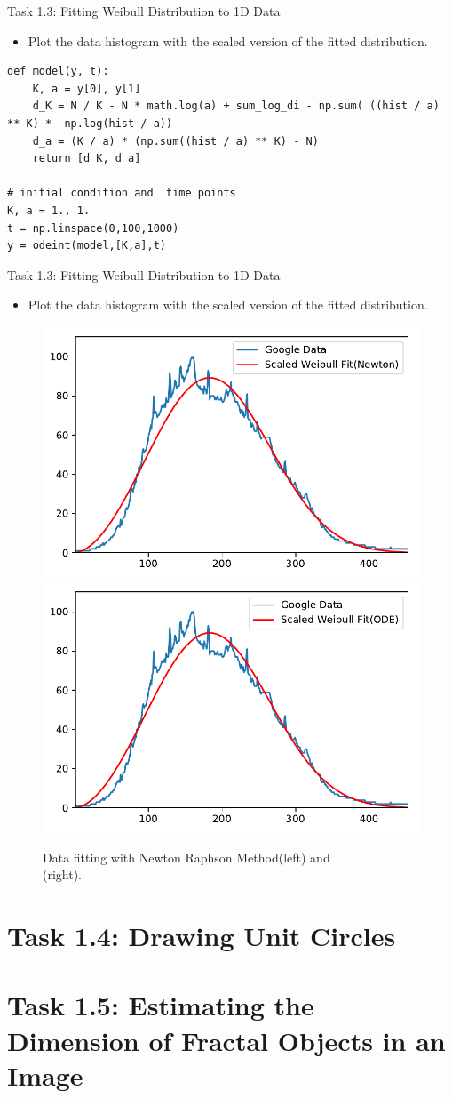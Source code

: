 \documentclass{beamer}
\begin{document}
\begin{frame}[fragile]{Task 1.3: Fitting Weibull Distribution to 1D Data}
\begin{itemize}
	\item{Plot the data histogram with the scaled version of the fitted distribution.}
\end{itemize}

\begin{lstlisting}[linewidth=12cm]
def model(y, t):
	K, a = y[0], y[1]
	d_K = N / K - N * math.log(a) + sum_log_di - np.sum( ((hist / a) ** K) *  np.log(hist / a))
	d_a = (K / a) * (np.sum((hist / a) ** K) - N)
	return [d_K, d_a]

# initial condition and  time points
K, a = 1., 1.
t = np.linspace(0,100,1000)
y = odeint(model,[K,a],t)
\end{lstlisting}

\end{frame}


\begin{frame}{Task 1.3: Fitting Weibull Distribution to 1D Data}
\begin{itemize}
	\item{Plot the data histogram with the scaled version of the fitted distribution.}
\end{itemize}

\begin{figure}
	\centering
	\includegraphics[width=.4\textwidth]{images/fit_newton.pdf}\quad
	\includegraphics[width=.4\textwidth]{images/fit_ode.pdf}
	\captionsetup{justification=centering}
	\caption{Data fitting with Newton Raphson Method(left) and \\ (right).}
\end{figure}
\end{frame}

\section{Task 1.4: Drawing Unit Circles}

\section{Task 1.5: Estimating the Dimension of Fractal Objects in an Image}
\end{document}
